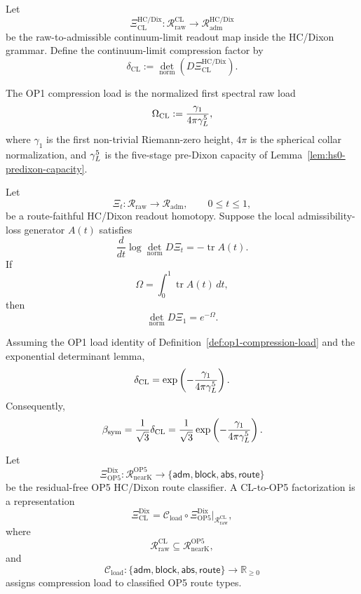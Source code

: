 \begin{definition}
\label{def:cl-compression-map}
Let
\[
  \Xi_{\mathrm{CL}}^{\mathrm{HC/Dix}}
  :
  \mathcal R_{\mathrm{raw}}^{\mathrm{CL}}
  \longrightarrow
  \mathcal R_{\mathrm{adm}}^{\mathrm{HC/Dix}}
\]
be the raw-to-admissible continuum-limit readout map inside the
HC/Dixon grammar.  Define the continuum-limit compression factor by
\[
  \delta_{\mathrm{CL}}
  :=
  \det_{\mathrm{norm}}
  \left(
    D\Xi_{\mathrm{CL}}^{\mathrm{HC/Dix}}
  \right).
\]
\end{definition}

\begin{definition}
\label{def:op1-compression-load}
The OP1 compression load is the normalized first spectral raw load
\[
  \Omega_{\mathrm{CL}}
  :=
  \frac{\gamma_1}{4\pi\gamma_L^5},
\]
where \(\gamma_1\) is the first non-trivial Riemann-zero height,
\(4\pi\) is the spherical collar normalization, and \(\gamma_L^5\) is the
five-stage pre-Dixon capacity of Lemma~\ref{lem:hs0-predixon-capacity}.
\end{definition}

\begin{lemma}
\label{lem:exponential-hcdixon-determinant}
Let
\[
  \Xi_t: \mathcal R_{\mathrm{raw}}\to \mathcal R_{\mathrm{adm}},
  \qquad 0\le t\le 1,
\]
be a route-faithful HC/Dixon readout homotopy.  Suppose the local
admissibility-loss generator \(A(t)\) satisfies
\[
  \frac{d}{dt}
  \log
  \det_{\mathrm{norm}}D\Xi_t
  =
  -\operatorname{tr}A(t).
\]
If
\[
  \Omega
  =
  \int_0^1 \operatorname{tr}A(t)\,dt,
\]
then
\[
  \det_{\mathrm{norm}}D\Xi_1
  =
  e^{-\Omega}.
\]
\end{lemma}

\begin{corollary}
\label{cor:op1-compression-factor}
Assuming the OP1 load identity of Definition~\ref{def:op1-compression-load}
and the exponential determinant lemma,
\[
  \delta_{\mathrm{CL}}
  =
  \exp\left(
    -\frac{\gamma_1}{4\pi\gamma_L^5}
  \right).
\]
Consequently,
\[
  \beta_{\mathrm{sym}}
  =
  \frac{1}{\sqrt3}\delta_{\mathrm{CL}}
  =
  \frac{1}{\sqrt3}
  \exp\left(
    -\frac{\gamma_1}{4\pi\gamma_L^5}
  \right).
\]
\end{corollary}

\begin{definition}
\label{def:cl-to-op5-factorization}
Let
\[
  \Xi_{\mathrm{OP5}}^{\mathrm{Dix}}
  :
  \mathcal R_{\mathrm{nearK}}^{\mathrm{OP5}}
  \longrightarrow
  \{\mathsf{adm},\mathsf{block},\mathsf{abs},\mathsf{route}\}
\]
be the residual-free OP5 HC/Dixon route classifier.  A CL-to-OP5
factorization is a representation
\[
  \Xi_{\mathrm{CL}}^{\mathrm{Dix}}
  =
  \mathcal C_{\mathrm{load}}
  \circ
  \Xi_{\mathrm{OP5}}^{\mathrm{Dix}}
  \big|_{\mathcal R_{\mathrm{raw}}^{\mathrm{CL}}},
\]
where
\[
  \mathcal R_{\mathrm{raw}}^{\mathrm{CL}}
  \subseteq
  \mathcal R_{\mathrm{nearK}}^{\mathrm{OP5}},
\]
and
\[
  \mathcal C_{\mathrm{load}}
  :
  \{\mathsf{adm},\mathsf{block},\mathsf{abs},\mathsf{route}\}
  \to
  \mathbb R_{\ge0}
\]
assigns compression load to classified OP5 route types.
\end{definition}

